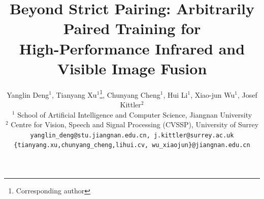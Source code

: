 \documentclass[10pt,twocolumn,letterpaper]{article}
\title{Beyond Strict Pairing: Arbitrarily Paired Training for\\ High-Performance Infrared and Visible Image Fusion}
\author{
    Yanglin Deng$^{1}$, 
    Tianyang Xu$^{1}$\thanks{Corresponding author},
    Chunyang Cheng$^{1}$, 
    Hui Li$^{1}$,
    Xiao-jun Wu$^{1}$,
    Josef Kittler$^{2}$ \\
    \noalign{\vspace{3pt}}
    \small $^{1}$ School of Artificial Intelligence and Computer Science, Jiangnan University\\
    \small $^{2}$ Centre for Vision, Speech and Signal Processing (CVSSP), University of Surrey \\
    {\tt\small yanglin\_deng@stu.jiangnan.edu.cn, j.kittler@surrey.ac.uk}\\
    {\tt\small\{tianyang.xu,chunyang\_cheng,lihui.cv, wu\_xiaojun\}@jiangnan.edu.cn} \\
}
\begin{document}
\maketitle
    






{
    \small
    
    
}
\clearpage
% 
\end{document}
